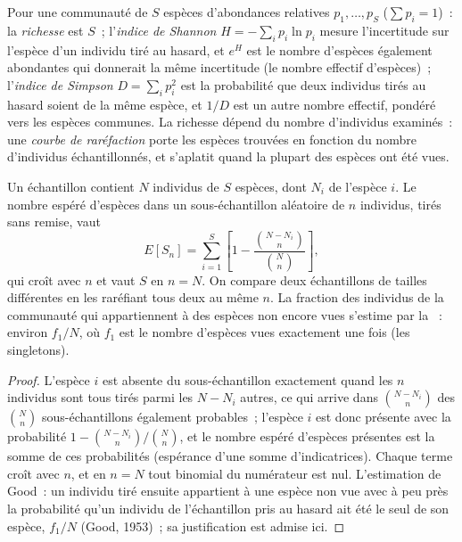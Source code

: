 \begin{definition}[La diversité]\label{def:b3:microbiomes:diversity}
Pour une communauté de $S$ espèces d'abondances relatives $p_{1},\dots,
p_{S}$ ($\sum p_{i} = 1$)~: la \emph{richesse} est $S$~; l'\emph{indice
de Shannon} $H = -\sum_{i} p_{i}\ln p_{i}$ mesure l'incertitude sur
l'espèce d'un individu tiré au hasard, et $e^{H}$ est le nombre
d'espèces également abondantes qui donnerait la même incertitude (le
nombre effectif d'espèces)~; l'\emph{indice de Simpson}
$D = \sum_{i} p_{i}^{2}$ est la probabilité que deux individus tirés au
hasard soient de la même espèce, et $1/D$ est un autre nombre effectif,
pondéré vers les espèces communes. La richesse dépend du nombre
d'individus examinés~: une \emph{courbe de raréfaction} porte les
espèces trouvées en fonction du nombre d'individus échantillonnés, et
s'aplatit quand la plupart des espèces ont été vues.
\end{definition}

\begin{theorem}[La raréfaction]\label{thm:b3:microbiomes:rarefaction}
Un échantillon contient $N$ individus de $S$ espèces, dont $N_{i}$ de
l'espèce $i$. Le nombre espéré d'espèces dans un sous-échantillon
aléatoire de $n$ individus, tirés sans remise, vaut
\[
E[S_{n}] = \sum_{i=1}^{S}\left[1 - \frac{\binom{N - N_{i}}{n}}
{\binom{N}{n}}\right],
\]
qui croît avec $n$ et vaut $S$ en $n = N$. On compare deux échantillons
de tailles différentes en les raréfiant tous deux au même $n$. La
fraction des individus de la communauté qui appartiennent à des espèces
non encore vues s'estime par la \emph{}~: environ
$f_{1}/N$, où $f_{1}$ est le nombre d'espèces vues exactement une fois
(les singletons).
\end{theorem}
\begin{proof}
L'espèce $i$ est absente du sous-échantillon exactement quand les $n$
individus sont tous tirés parmi les $N - N_{i}$ autres, ce qui arrive
dans $\binom{N - N_{i}}{n}$ des $\binom{N}{n}$ sous-échantillons
également probables~; l'espèce $i$ est donc présente avec la
probabilité $1 - \binom{N-N_{i}}{n}/
\binom{N}{n}$, et le nombre espéré d'espèces présentes est la somme de
ces probabilités (espérance d'une somme d'indicatrices). Chaque terme
croît avec $n$, et en $n = N$ tout binomial du numérateur est nul.
L'estimation de Good~: un individu tiré ensuite appartient à une espèce
non vue avec à peu près la probabilité qu'un individu de l'échantillon
pris au hasard ait été le seul de son espèce, $f_{1}/N$ (Good, 1953)~;
sa justification est admise ici.
\end{proof}

